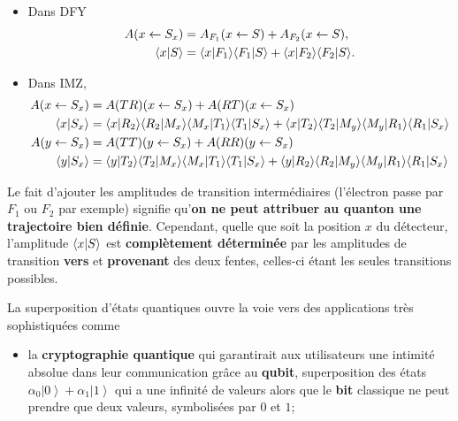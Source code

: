 \begin{enumerate}
\begin{itemize}
\item Dans DFY%
\begin{subequations}%
\begin{align}
A(x\leftarrow S_{x}) &=A_{F_1}(x\leftarrow S)+A_{F_2}(x\leftarrow S),\\
\langle x\ket{S}  &  =\langle x\ket{F_1}\langle F_1\ket{S} +\langle
x\ket{F_2}\langle F_2\ket{S}.
\label{eq:PSuperp}%
\end{align}%
\end{subequations}%

\item Dans IMZ,%
\begin{subequations}%
\label{eq:Amplixy}%
\begin{align}
A(x\leftarrow S_{x}) & =A(TR)(x\leftarrow S_{x})+A(RT)(x\leftarrow S_{x})\\
\langle x\vert S_{x}\rangle &  =\langle x\vert R_2\rangle\langle R_2\vert M_{x}\rangle\langle
M_{x}\vert T_1\rangle\langle T_1\vert S_{x}\rangle+\langle x\vert T_2\rangle\langle
T_2\vert M_{y}\rangle\langle M_{y}\vert R_1\rangle\langle R_1\vert S_{x}\rangle\\
A(y\leftarrow S_{x}) & =A(TT)(y\leftarrow S_{x})+A(RR)(y\leftarrow S_{x})\\
\langle y\vert S_{x}\rangle &  =\langle y\vert T_2\rangle\langle T_2\vert M_{x}\rangle\langle
M_{x}\vert T_1\rangle\langle T_1\vert S_{x}\rangle+\langle y\vert R_2\rangle\langle
R_2\vert M_{y}\rangle\langle M_{y}\vert R_1\rangle\langle R_1\vert S_{x}\rangle
\end{align}%
\end{subequations}%

\end{itemize}

Le fait d'ajouter les amplitudes de transition intermédiaires (l'électron
passe par $F_1$ ou $F_2$ par exemple) signifie qu'\textbf{on ne peut
attribuer au quanton une trajectoire bien définie}. Cependant, quelle que soit
la position $x$ du détecteur, l'amplitude $\langle x\vert S\rangle
$ est \textbf{complètement déterminée} par les amplitudes de transition
\textbf{vers} et \textbf{provenant }des deux fentes, celles-ci étant les
seules transitions possibles.

La superposition d'états quantiques ouvre la voie vers des applications très
sophistiquées comme

\begin{itemize}
\item la \textbf{cryptographie quantique} qui garantirait aux utilisateurs une
intimité absolue dans leur communication grâce au \textbf{qubit},
superposition des états $\alpha_{0}\left\vert 0\right\rangle +\alpha
_1\left\vert 1\right\rangle $ qui a une infinité de valeurs alors que le
\textbf{bit} classique ne peut prendre que deux valeurs, symbolisées par $0$
et $1$;


\end{itemize}
\end{enumerate}
